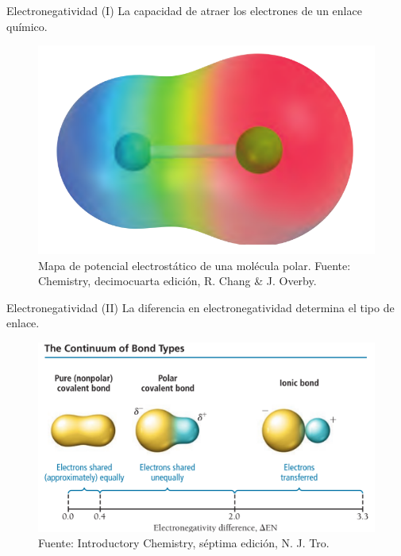 \documentclass{beamer}
\begin{document}
  \begin{frame}{Electronegatividad (I)}
    La capacidad de atraer los electrones de un enlace químico.
    \begin{figure}
      \centering
      \includegraphics[width=0.8\linewidth]{imgs/emp}
      \caption{Mapa de potencial electrostático de una molécula polar. Fuente: Chemistry, decimocuarta edición, R. Chang \& J. Overby. }
      \label{fig:emp}
    \end{figure}
  \end{frame}
  \begin{frame}{Electronegatividad (II)}
    La diferencia en electronegatividad determina el tipo de enlace.
    \begin{figure}
      \centering
      \includegraphics[width=0.9\linewidth]{imgs/polarornonpolar}
      \caption{Fuente: Introductory Chemistry, séptima edición, N. J. Tro.}
      \label{fig:polarornonpolar}
    \end{figure}
  \end{frame}
\end{document}
